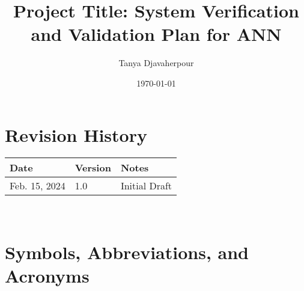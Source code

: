 \documentclass[12pt, titlepage]{article}
\begin{document}
\title{Project Title: System Verification and Validation Plan for ANN} 
\author{Tanya Djavaherpour}
\date{\today}
	
\maketitle


\section*{Revision History}

\begin{tabularx}{\textwidth}{p{3cm}p{2cm}X}
\toprule {\bf Date} & {\bf Version} & {\bf Notes}\\
\midrule
Feb. 15, 2024 & 1.0 & Initial Draft\\
\bottomrule
\end{tabularx}

~\\


\newpage

\tableofcontents

\listoftables
{}

\listoffigures
{}

\newpage

\section{Symbols, Abbreviations, and Acronyms}
\end{document}
